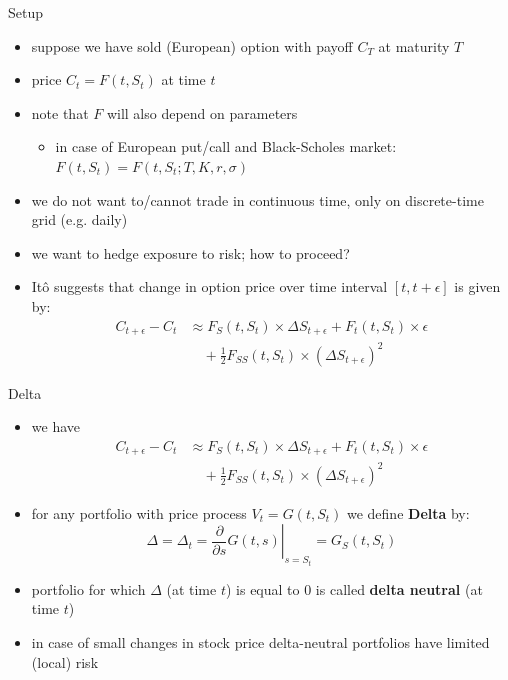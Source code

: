 \documentclass[pdf, handout]{beamer}
\begin{document}
\begin{frame}{Setup}
\begin{itemize}
\item suppose we have sold (European) option with payoff 
$C_T$ at maturity $T$
\item price $C_t = F(t,S_t)$  at time $t$
\item note that $F$ will also depend on parameters
\begin{itemize}  
\item in case of European put/call and Black-Scholes market:  $F(t,S_t) =F(t,S_t; T, K, r,\sigma)$
\end{itemize}
\item we do not want to/cannot trade in continuous time, only 
on discrete-time grid (e.g. daily)
\item we want to hedge exposure to risk; how to proceed?
\item It\^{o} suggests that change in option price over time interval
$[t, t+\epsilon]$ is given by:
\begin{align*}
C_{t+\epsilon} -C_t  & 
\approx
 F_S(t,S_t)\times \Delta S_{t+\epsilon} 
+ F_t(t,S_t)\times \epsilon \\
&\quad +\frac{1}{2} F_{SS}(t,S_t) \times 
\left(\Delta S_{t+\epsilon}\right)^2
\end{align*}
\end{itemize}
\end{frame}


\begin{frame}{Delta}
\begin{itemize}
\item we have
\begin{align*}
C_{t+\epsilon} - C_t 
&\approx
F_S(t,S_t)\times \Delta S_{t+\epsilon} 
+ F_t(t,S_t)\times \epsilon \\
&\quad +\frac{1}{2} F_{SS}(t,S_t) \times 
\left(\Delta S_{t+\epsilon}\right)^2
\end{align*}
\item for any portfolio with price process $V_t=G(t,S_t)$ we define
\textbf{Delta} by:  
\[
\Delta=\Delta_t =\left. \frac{\partial }{\partial s} G(t,s)\right|_{s=S_t} = G_S(t,S_t)
\]
\item portfolio for which $\Delta$ (at time $t$) is equal to 0 is called \textbf{delta neutral}  (at time $t$)
\item in case of small changes in stock price delta-neutral portfolios have limited (local) risk
\end{itemize}
\end{frame}
\end{document}
